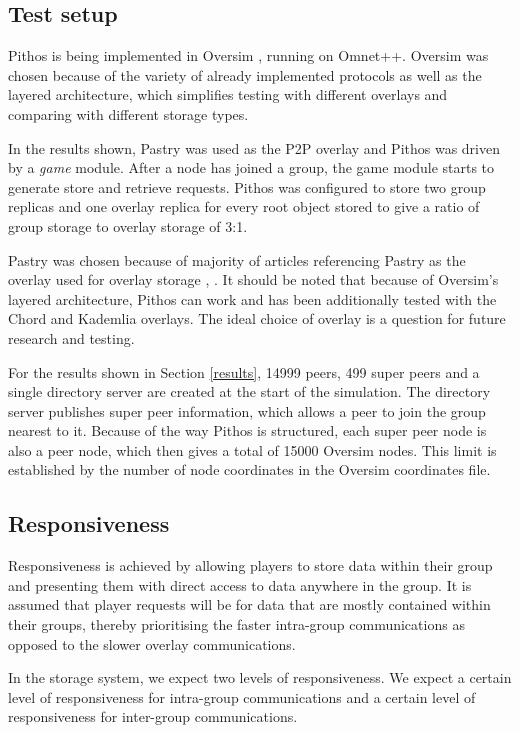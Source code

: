 \documentclass[10pt,a4paper,conference]{IEEEtran}
\begin{document}
\subsection{Test setup}

Pithos is being implemented in Oversim \cite{OverSim_2007}, running on Omnet++. Oversim was chosen because of the variety of already implemented
protocols as well as the layered architecture, which simplifies testing with different overlays and comparing with different storage types.

In the results shown, Pastry was used as the P2P overlay and Pithos was driven by a \emph{game} module. After a node has joined a group, the game
module starts to generate store and retrieve requests. Pithos was configured to store two group replicas and one overlay replica for every root
object stored to give a ratio of group storage to overlay storage of 3:1.

Pastry was chosen because of majority of articles referencing Pastry as the overlay used for overlay storage \cite{past_storage_focus},
\cite{Fan_phd}. It should be noted that because of Oversim's layered architecture, Pithos can work and has been additionally tested with the Chord
and Kademlia overlays. The ideal choice of overlay is a question for future research and testing.

For the results shown in Section \ref{results}, 14999 peers, 499 super peers and a single directory server are created at the start of the
simulation. The directory server publishes super peer information, which allows a peer to join the group nearest to it. Because of the way Pithos is
structured, each super peer node is also a peer node, which then gives a total of 15000 Oversim nodes. This limit is established by the number of
node coordinates in the Oversim coordinates file.

\subsection{Responsiveness}

Responsiveness is achieved by allowing players to store data within their group and presenting them with direct access to data anywhere in the group.
It is assumed that player requests will be for data that are mostly contained within their groups, thereby prioritising the faster intra-group
communications as opposed to the slower overlay communications.

In the storage system, we expect two levels of responsiveness. We expect a certain level of responsiveness for intra-group communications and a
certain level of responsiveness for inter-group communications.
\end{document}
